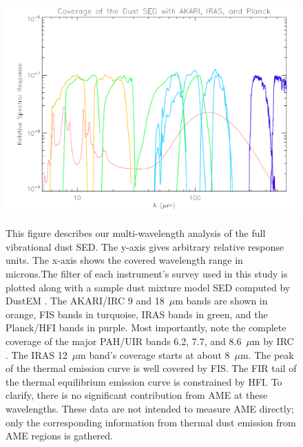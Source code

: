 \begin{figure}[htbp]
\begin{center}
\label{allbands}
\includegraphics[width=150mm]{EPS/AKARI_rsr_thesis.pdf}
\caption{This figure describes our multi-wavelength analysis of the full vibrational dust SED.  The y-axis gives arbitrary relative response units. The x-axis shows the covered wavelength range in microns.The filter of each instrument's survey used in this study is plotted along with a sample dust mixture model SED computed by DustEM \citep{dustem11}. The AKARI/IRC 9 and 18~$\mu$m bands are shown in orange, FIS bands in turquoise, IRAS bands in green, and the Planck/HFI bands in purple. Most importantly, note the complete coverage of the major PAH/UIR bands 6.2, 7.7, and 8.6~$\mu$m by IRC \cite{ishihara10}. The IRAS 12~$\mu$m band's coverage starts at about 8~$\mu$m. The peak of the thermal emission curve is well covered by FIS.  The FIR tail of the thermal equilibrium emission curve is constrained by HFI.  To clarify, there is no significant contribution from AME at these wavelengths. These data are not intended to measure AME directly; only the corresponding information from thermal dust emission from AME regions is gathered.
 }
\end{center}
\end{figure}
